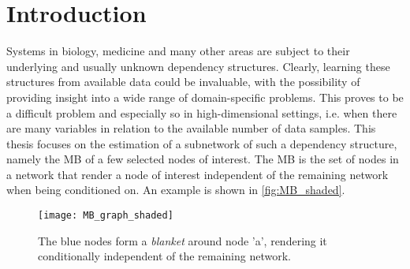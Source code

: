 \chapter{Introduction}
Systems in biology, medicine and many other areas are subject to their underlying and usually unknown dependency structures.
Clearly, learning these structures from available data could be invaluable, with the possibility of providing insight into a wide range of domain-specific problems.
This proves to be a difficult problem and especially so in high-dimensional settings, i.e. when there are many variables in relation to the available number of data samples.
This thesis focuses on the estimation of a subnetwork of such a dependency structure, namely the \gls{MB} of a few selected nodes of interest.
The  \gls{MB} is the set of nodes in a network that render a node of interest independent of the remaining network when being conditioned on. An example is shown in \autoref{fig:MB_shaded}.
\begin{figure}[H]
	\centering
	\texttt{[image: MB\_graph\_shaded]}
	\caption{The blue nodes form a \textit{blanket} around node 'a', rendering it conditionally independent of the remaining network.}
	
	\label{fig:MB_shaded}
\end{figure}

